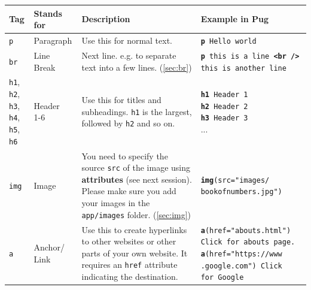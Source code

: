 \begin{table}[H]
    \centering
    \begin{tabular}{|m{3.5em}|m{4.5em}|m{12em}|m{13em}|}
        \hline
        \textbf{Tag} & 
        Stands for &    
        Description & 
        Example in Pug
        \\ \hline \hline
        
        \texttt{p} &
        Paragraph & 
        Use this for normal text. &
        \texttt{\textbf{p} Hello world}
        \\ \hline
        
        \texttt{br} &
        Line Break & 
        Next line. e.g. to separate text into a few lines. (\cref{sec:br}) &
        \texttt{\textbf{p} this is a line \textbf{<br />} this is another line}
        \\ \hline
        
        \makecell[lb]{
            \texttt{h1}, \texttt{h2},\\ \texttt{h3}, \texttt{h4},\\ \texttt{h5}, \texttt{h6}
        } &
        \makecell[lb]{
        Header \\ 1-6 
        } & 
        Use this for titles and subheadings. \texttt{h1} is the largest, followed by \texttt{h2} and so on. &
        \makecell[lb]{
            \texttt{\textbf{h1} Header 1} \\
            \texttt{\textbf{h2} Header 2} \\
            \texttt{\textbf{h3} Header 3} \\
            ...
        }
        \\ \hline
        
        \texttt{img} &
        Image & 
        You need to specify the source \texttt{src} of the image using \textbf{attributes} (see next session). Please make sure you add your images in the \texttt{app/images} folder. (\cref{sec:img}) &
        \texttt{\textbf{img}(src="images/ bookofnumbers.jpg")}
        \\ \hline
        
        \texttt{a} &
        Anchor/ Link &
        Use this to create hyperlinks to other websites or other parts of your own website. It requires an \texttt{href} attribute indicating the destination. &
        \makecell[lb]{
            \texttt{\textbf{a}(href="abouts.html")}\\\texttt{Click for abouts page.} \\
            \texttt{\textbf{a}(href="https://www}\\\texttt{.google.com") Click}\\\texttt{for Google}
        }
        \\ \hline
        

\end{tabular}
\end{table}
